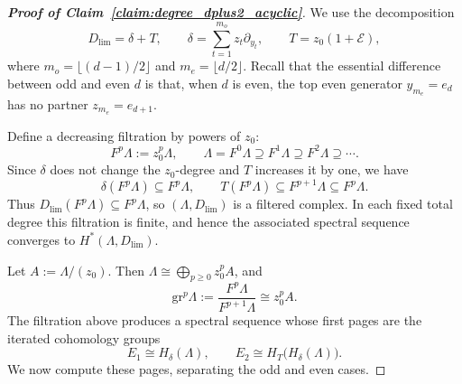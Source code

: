 \documentclass[aps,prx,reprint,superscriptaddress,twocolumn,amsmath,amssymb,amsfonts, nofootinbib]{revtex4-2}
\theoremstyle{apsstyle}
\begin{document}
\begin{proof}[\textnormal{\textbf{Proof of Claim~\ref{claim:degree_dplus2_acyclic}}}]
We use the decomposition
\begin{equation}
D_{\lim}=\delta+T,
\qquad
\delta=\sum_{t=1}^{m_o}z_t\partial_{y_t},
\qquad
T=z_0(1+\mathcal E),
\end{equation}
where $m_o=\lfloor (d-1)/2\rfloor$ and $m_e=\lfloor d/2\rfloor$. Recall that the essential difference between odd and even $d$ is that, when $d$ is even, the top even generator $y_{m_e}=e_d$ has no partner $z_{m_e}=e_{d+1}$.

\medskip

Define a decreasing filtration by powers of $z_0$:
\begin{equation}
F^p\Lambda:=z_0^p\Lambda,
\qquad
\Lambda=F^0\Lambda\supseteq F^1\Lambda\supseteq F^2\Lambda\supseteq \cdots .
\label{eq:z0_filtration}
\end{equation}
Since $\delta$ does not change the $z_0$-degree and $T$ increases it by one, we have
\begin{equation}
\delta(F^p\Lambda)\subseteq F^p\Lambda,
\qquad
T(F^p\Lambda)\subseteq F^{p+1}\Lambda\subseteq F^p\Lambda.
\end{equation}
Thus $D_{\lim}(F^p\Lambda)\subseteq F^p\Lambda$, so $(\Lambda,D_{\lim})$ is a filtered complex. In each fixed total degree this filtration is finite, and hence the associated spectral sequence converges to $H^*(\Lambda,D_{\lim})$.

\medskip

Let $A:=\Lambda/(z_0)$. Then $\Lambda\cong \bigoplus_{p\geq 0}z_0^p A$, and
\begin{equation}
\mathrm{gr}^p\Lambda:=\frac{F^p\Lambda}{F^{p+1}\Lambda}
\cong z_0^p A.
\label{eq:associated_graded_identification}
\end{equation}
\noindent The filtration above produces a spectral sequence whose first pages are the iterated cohomology groups
\begin{equation}
E_1\cong H_\delta(\Lambda),
\qquad
E_2\cong H_T\bigl(H_\delta(\Lambda)\bigr).
\label{eq:E1_E2_iterated}
\end{equation}
We now compute these pages, separating the odd and even cases.

\medskip


\end{proof}
\end{document}
